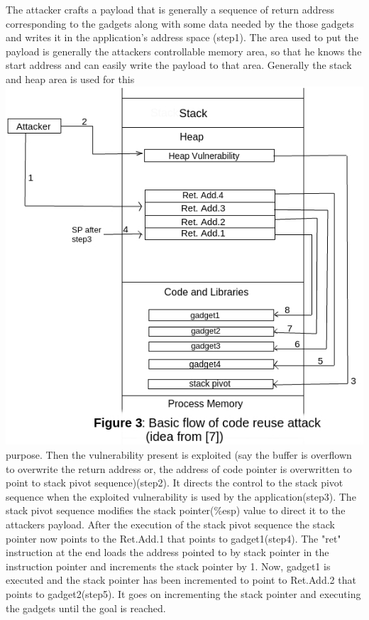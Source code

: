 \documentclass{article}
\begin{document}
\begin{multicols}{2}
	The attacker crafts a payload that is generally a sequence of return address corresponding to the gadgets along with some data needed by the those gadgets and writes it in the application's address space (step1). The area used to put the payload is generally the attackers controllable memory area, so that he knows the start address and can easily write the payload to that area. Generally the stack and heap area is used for this \break \break \includegraphics[scale=.40]{rop.jpg}\break purpose. Then the vulnerability present is exploited (say the buffer is overflown to overwrite the return address or, the address of code pointer is overwritten to point to stack pivot sequence)(step2). It directs the control to the stack pivot sequence when the exploited vulnerability is used by the application(step3). The stack pivot sequence modifies the stack pointer(\%esp) value to direct it to the attackers payload. After the execution of the stack pivot sequence the stack pointer now points to the Ret.Add.1 that points to gadget1(step4). The "ret" instruction at the end loads the address pointed to by stack pointer in the instruction pointer and increments the stack pointer by 1. Now, gadget1 is executed and the stack pointer has been incremented to point to Ret.Add.2 that points to gadget2(step5). It goes on incrementing the stack pointer and executing the gadgets until the goal is reached.
	

\end{multicols}
\end{document}
